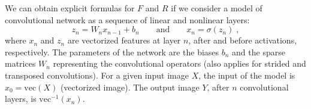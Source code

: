 \documentclass[letterpaper]{article}
\begin{document}
We can obtain explicit formulas for $F$ and $R$ if we consider a model of convolutional network as a sequence of linear and nonlinear layers:
\begin{equation}
    z_n = W_n x_{n-1} + b_n \quad\quad\text{and}\quad\quad x_n = \sigma\left(z_n\right) \;, \label{eq:cnn_model}
\end{equation}
where $x_n$ and $z_n$ are vectorized features at layer $n$, after and before activations, respectively. The parameters of the network are the biases $b_n$ and the sparse matrices $W_n$ representing the convolutional operators (also applies for strided and transposed convolutions). For a given input image $X$, the input of the model is $x_0=\text{vec}(X)$ (vectorized image). The output image $Y$, after $n$ convolutional layers, is $\text{vec}^{-1}(x_n)$.
\begin{table*}[ht]
  \caption{\textbf{Quantitative evaluation} of different SR methods. In {\color{red} red} color we show the best result, in {\color{blue} blue} the top--$2$ and {\color{brown} brown} the top--$3$ results for each column and scale. Methods are ordered by increasing number of parameters.}
  \label{tab:quantitative}
  \centering
{}
\end{table*}
\end{document}
